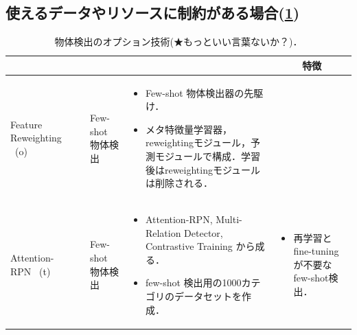 \documentclass[originalpaper,fleqn]{jsaiart}     %
\begin{document}
\subsection{使えるデータやリソースに制約がある場合(\ref{tbl-select-sub})}
\begin{table}
    \caption{物体検出のオプション技術(★もっといい言葉ないか？)．}
    \label{tbl-select-sub}
    \begin{center}
        \setlength{\tabcolsep}{3pt}
        \footnotesize
        \begin{tabularx}{\linewidth}{Xp{1.5cm}Xp{7cm}X} \toprule
            \centering{モデル名称} & \centering{文献} & \centering{用途} & \centering{概要} & \multicolumn{1}{c}{特徴} \\ \midrule

            Feature Reweighting \ (o)
            \vspace{0.7\baselineskip}
            \footnote[2] & \cite{KLWYFD19} & Few-shot 物体検出 & 
            \begin{itemize}
                \vspace{-0.7\baselineskip}
                \setlength{\leftskip}{-3mm}
                \item Few-shot 物体検出器の先駆け．
                \item メタ特徴量学習器，reweightingモジュール，予測モジュールで構成．学習後はreweightingモジュールは削除される．
            \end{itemize}
            &
            \\

            Attention-RPN \ (t)
            \vspace{0.7\baselineskip}
            \footnote[1] & \cite{FZTT20} & Few-shot 物体検出 & 
            \begin{itemize}
                \vspace{-0.7\baselineskip}
                \setlength{\leftskip}{-3mm}
                \item Attention-RPN, Multi-Relation Detector, Contrastive Training から成る．
                \item few-shot 検出用の1000カテゴリのデータセットを作成．
            \end{itemize}
            &
            \begin{itemize}
                \vspace{-0.7\baselineskip}
                \setlength{\leftskip}{-3mm}
                \item 再学習とfine-tuningが不要なfew-shot検出．
            \end{itemize}
            \\


\end{tabularx}
\end{center}
\end{table}
\end{document}
